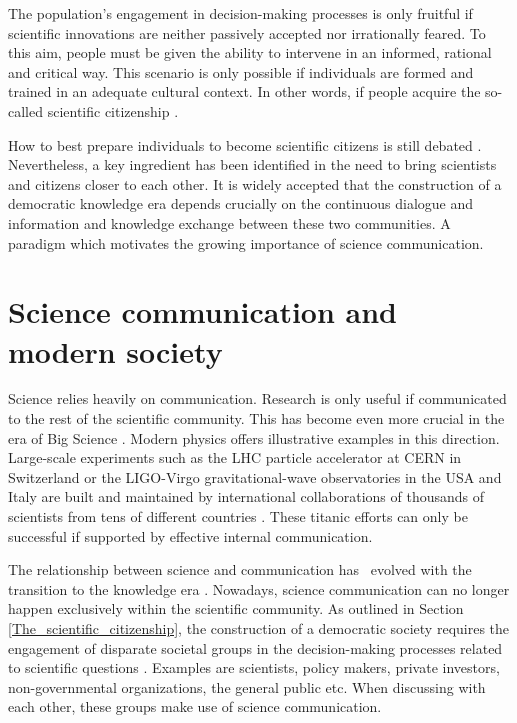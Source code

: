 The population's engagement in decision-making processes is only fruitful if scientific innovations are neither passively accepted nor irrationally feared. To this aim, people must be given the ability to intervene in an informed, rational and critical way. This scenario is only possible if individuals are formed and trained in an adequate cultural context. In other words, if people acquire the so-called scientific citizenship \cite{Arnason}.

How to best prepare individuals to become scientific citizens is still debated \cite{Nowotny}. Nevertheless, a key ingredient has been identified in the need to bring scientists and citizens closer to each other. It is widely accepted that the construction of a democratic knowledge era depends crucially on the continuous dialogue and information and knowledge exchange between these two communities. A paradigm which motivates the growing importance of science communication.

\section{Science communication and modern society} \label{Science_communication_and_modern_society}    
Science relies heavily on communication. Research is only useful if communicated to the rest of the scientific community. This has become even more crucial in the era of Big Science \cite{Galison}. Modern physics offers illustrative examples in this direction. Large-scale experiments such as the LHC particle accelerator at CERN in Switzerland or the LIGO-Virgo gravitational-wave observatories in the USA and Italy are built and maintained by international collaborations of thousands of scientists from tens of different countries \cite{CERN, LIGO, Virgo}. These titanic efforts can only be successful if supported by effective internal communication.  

The relationship between science and communication has \, evolved with the transition to the knowledge era \cite{Holliman}. Nowadays, science communication can no longer happen exclusively within the scientific community. As outlined in Section \ref{The_scientific_citizenship}, the construction of a democratic society requires the engagement of disparate societal groups in the decision-making processes related to scientific questions \cite{Wynne}. Examples are scientists, policy makers, private investors, non-governmental organizations, the general public etc. When discussing with each other, these groups make use of science communication.

